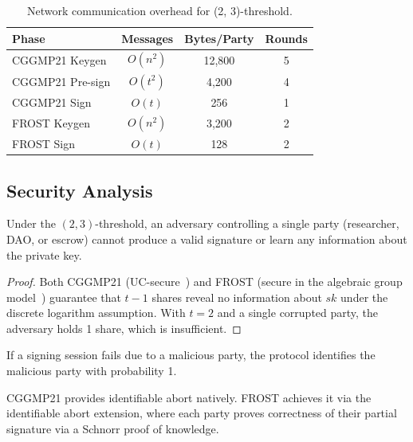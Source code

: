 \begin{table}[t]
\centering
\begin{tabular}{lccc}
\toprule
\textbf{Phase} & \textbf{Messages} & \textbf{Bytes/Party} & \textbf{Rounds} \\
\midrule
CGGMP21 Keygen & $O(n^2)$ & 12,800 & 5 \\
CGGMP21 Pre-sign & $O(t^2)$ & 4,200 & 4 \\
CGGMP21 Sign & $O(t)$ & 256 & 1 \\
FROST Keygen & $O(n^2)$ & 3,200 & 2 \\
FROST Sign & $O(t)$ & 128 & 2 \\
\bottomrule
\end{tabular}
\caption{Network communication overhead for (2, 3)-threshold.}
\label{tab:network}
\end{table}

\subsection{Security Analysis}

\begin{theorem}
Under the $(2, 3)$-threshold, an adversary controlling a single party (researcher, DAO, or escrow) cannot produce a valid signature or learn any information about the private key.
\end{theorem}

\begin{proof}
Both CGGMP21 (UC-secure~\cite{cggmp2021}) and FROST (secure in the algebraic group model~\cite{komlo2020frost}) guarantee that $t - 1$ shares reveal no information about $sk$ under the discrete logarithm assumption. With $t = 2$ and a single corrupted party, the adversary holds 1 share, which is insufficient.
\end{proof}

\begin{theorem}
If a signing session fails due to a malicious party, the protocol identifies the malicious party with probability 1.
\end{theorem}

CGGMP21 provides identifiable abort natively. FROST achieves it via the identifiable abort extension, where each party proves correctness of their partial signature via a Schnorr proof of knowledge.

